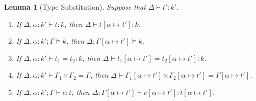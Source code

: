 \documentclass{article}
\newcommand{\TASS}[1]{#1\colon\!}
\newcommand{\TVAR}{\alpha}
\newcommand{\KENV}{\Delta}
\newcommand{\TENV}{\Gamma}
\newcommand{\SPLIT}[3]{#1 \ltimes #2 = #3} %
\newtheorem{lemma}{Lemma}
\begin{document}
\begin{lemma}[Type Substitution]\label{lemma:type-substitution}
  Suppose that $\KENV \vdash t' : k'$.
  \begin{enumerate}
  \item\label{item:1} If $\KENV, \TASS\TVAR {k'} \vdash t : k$, then
    $\KENV \vdash t[\TVAR \mapsto t'] : k$.
  \item\label{item:3} If $\KENV, \TASS\TVAR {k'}; \TENV \models k$,
    then $\KENV; \TENV[\TVAR \mapsto t'] \models k$.
  \item\label{item:5} If $\KENV, \TASS\TVAR {k'} \vdash t_1 = t_2 : k$,
    then $\KENV \vdash t_1[\TVAR \mapsto t'] = t_2[\TVAR \mapsto t'] : k$.
  \item\label{item:4} If
    $\KENV, \TASS\TVAR {k'} \vdash \SPLIT{\TENV_1}{\TENV_2}{\TENV}$,
    then $\KENV \vdash \SPLIT{\TENV_1[\TVAR \mapsto t']}{\TENV_2[\TVAR \mapsto t']}{\TENV[\TVAR \mapsto t']}$.
  \item\label{item:2} If $\KENV, \TASS\TVAR {k'}; \TENV \vdash e : t$, then
    $\KENV; \TENV[\TVAR \mapsto t'] \vdash e[\TVAR \mapsto t'] : t[\TVAR \mapsto t']$.
  \end{enumerate}
\end{lemma}
\end{document}
